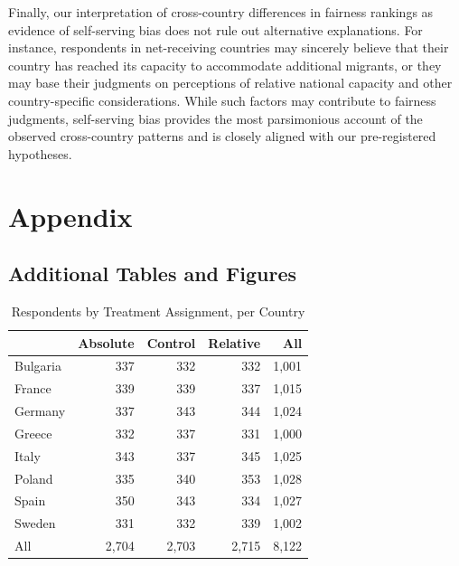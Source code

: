 \documentclass[
  12pt,
  a4paper,
]{article}
\begin{document}
Finally, our interpretation of cross-country differences in fairness rankings as evidence of self-serving bias does not rule out alternative explanations. For instance, respondents in net-receiving countries may sincerely believe that their country has reached its capacity to accommodate additional migrants, or they may base their judgments on perceptions of relative national capacity and other country-specific considerations. While such factors may contribute to fairness judgments, self-serving bias provides the most parsimonious account of the observed cross-country patterns and is closely aligned with our pre-registered hypotheses.

\appendix


\newpage

\setcounter{figure}{1}
\setcounter{table}{1}
\renewcommand\thefigure{\thesection.\arabic{figure}}    
\renewcommand\thetable{\thesection.\arabic{figure}}

\section{Appendix}\label{appendix}

\subsection{Additional Tables and Figures}\label{additional-tables-and-figures}

\begin{table}
\centering
\caption{\label{tab:random-assignment}Respondents by Treatment Assignment, per Country}
\centering
\begin{tabular}[t]{lrrrr}
\toprule
  & Absolute & Control & Relative & All\\
\midrule
Bulgaria & 337 & 332 & 332 & 1,001\\
France & 339 & 339 & 337 & 1,015\\
Germany & 337 & 343 & 344 & 1,024\\
Greece & 332 & 337 & 331 & 1,000\\
Italy & 343 & 337 & 345 & 1,025\\
Poland & 335 & 340 & 353 & 1,028\\
Spain & 350 & 343 & 334 & 1,027\\
Sweden & 331 & 332 & 339 & 1,002\\
\addlinespace
All & 2,704 & 2,703 & 2,715 & 8,122\\
\bottomrule
\end{tabular}
\end{table}
\end{document}
